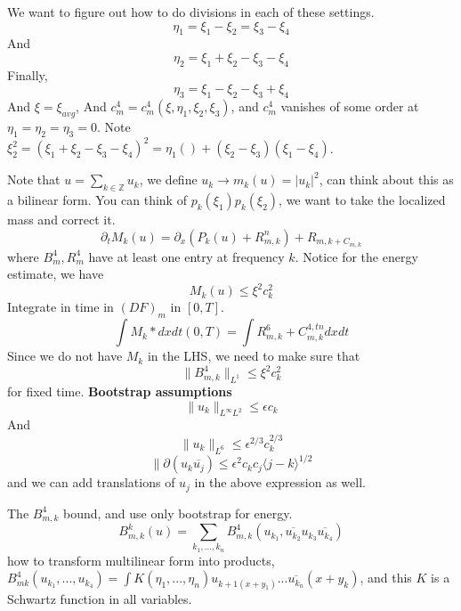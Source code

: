 We want to figure out how to do divisions in each of these settings. 
\begin{equation*}
    \eta_1=\xi_1-\xi_2=\xi_3-\xi_4
\end{equation*}
And 
\begin{equation*}
    \eta_2=\xi_1+\xi_2-\xi_3-\xi_4
\end{equation*}
Finally,
\begin{equation*}
    \eta_3=\xi_1-\xi_2-\xi_3+\xi_4
\end{equation*}
And $\xi=\xi_{avg}$, And $c_m^4=c_m^4(\xi, \eta_1, \xi_2, \xi_3)$, and $c_m^4$ vanishes of some order at $\eta_1=\eta_2=\eta_3=0$. Note $\xi_2^2=(\xi_1+\xi_2-\xi_3-\xi_4)^2=\eta_1()+(\xi_2-\xi_3)(\xi_1-\xi_4)$.

Note that $u=\sum_{k\in\mathbb{Z}}u_k$, we define $u_k\to m_k(u)=|u_k|^2$, can think about this as a bilinear form. You can think of $p_k(\xi_1)p_k(\xi_2)$, we want to take the localized mass and correct it.
\begin{equation*}
    \partial_tM_k(u)=\partial_x(P_k(u)+R_{m,k}^n)+R_{m,k+C_{m,k}}
\end{equation*} 
where $B_m^4, R_m^4$ have at least one entry at frequency $k$. Notice for the energy estimate, we have 
\begin{equation*}
    M_k(u)\leq\xi^2c_k^2
\end{equation*}
Integrate in time in $(DF)_m$ in $[0,T]$. 
\begin{equation*}
    \int M_k*dxdt(0,T)=\int R_{m,k}^6+C_{m,k}^{4, tn}dxdt
\end{equation*}
Since we do not have $M_k$ in the LHS, we need to make sure that 
\begin{equation*}
    \|B_{m,k}^4\|_{L^1}\leq \xi^2c_k^2
\end{equation*}
for fixed time.
\textbf{Bootstrap assumptions}
\begin{equation*}
    \|u_k\|_{L^\infty L^2}\leq\epsilon c_k
\end{equation*}
And 
\begin{equation*}
    \|u_k\|_{L^6}\leq\epsilon^{2/3}c_k^{2/3}
\end{equation*}
\begin{equation*}
    \|\partial(u_k\overline{u_j})\leq\epsilon^2c_kc_j\langle j-k\rangle^{1/2}
\end{equation*}
and we can add translations of $u_j$ in the above expression as well.

The $B_{m,k}^4$ bound, and use only bootstrap for energy.
\begin{equation*}
    B_{m,k}^k(u)=\sum_{k_1, ..., k_n}B_{m,k}^4(u_{k_1}, \overline{u_{k_2}} u_{k_3} \overline{u_{k_4}})
\end{equation*}
how to transform multilinear form into products, $B_{mk}^4(u_{k_1}, ..., u_{k_4})=\int K(\eta_1, ..., \eta_n)u_{k+1(x+y_1)}...\overline{u_{k_n}}(x+y_k)$, and this $K$ is a Schwartz function in all variables.

